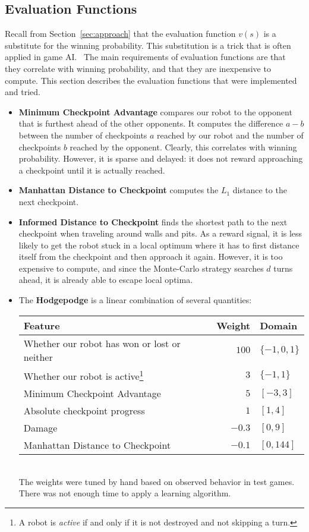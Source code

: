 \documentclass{article}
\newcommand{\state}{s}
\newcommand{\evaluator}{v}
\begin{document}
\subsection{Evaluation Functions} \label{sec:evaluators}

Recall from Section~\ref{sec:approach} that the evaluation function $\evaluator(\state)$ is a substitute for the winning probability.  This substitution is a trick that is often applied in game AI.~\cite{russell1995artificial}  The main requirements of evaluation functions are that they correlate with winning probability, and that they are inexpensive to compute.  This section describes the evaluation functions that were implemented and tried.

\begin{itemize}
\item \textbf{Minimum Checkpoint Advantage} compares our robot to the opponent that is furthest ahead of the other opponents.  It computes the difference $a - b$ between the number of checkpoints $a$ reached by our robot and the number of checkpoints $b$ reached by the opponent.  Clearly, this correlates with winning probability.  However, it is sparse and delayed: it does not reward approaching a checkpoint until it is actually reached. \\
\item \textbf{Manhattan Distance to Checkpoint} computes the $L_1$ distance to the next checkpoint. \\
\item \textbf{Informed Distance to Checkpoint} finds the shortest path to the next checkpoint when traveling around walls and pits.  As a reward signal, it is less likely to get the robot stuck in a local optimum where it has to first distance itself from the checkpoint and then approach it again.  However, it is too expensive to compute, and since the Monte-Carlo strategy searches $d$ turns ahead, it is already able to escape local optima. \\
\item The \textbf{Hodgepodge} is a linear combination of several quantities: \\
  \begin{tabular}{l|r|l}
    Feature & Weight & Domain \\
    \hline
    Whether our robot has won or lost or neither & $100$ & $\{-1,0,1\}$ \\
    Whether our robot is active\footnote{A robot is \emph{active} if and only if it is not destroyed and not skipping a turn.} & $3$ & $\{-1,1\}$ \\
    Minimum Checkpoint Advantage & $5$ & $[-3,3]$ \\
    Absolute checkpoint progress & $1$ & $[1,4]$ \\
    Damage                       & $-0.3$ & $[0,9]$ \\
    Manhattan Distance to Checkpoint & $-0.1$ & $[0,144]$ \\
  \end{tabular} \\
  The weights were tuned by hand based on observed behavior in test games.  There was not enough time to apply a learning algorithm.
\end{itemize}
\end{document}
